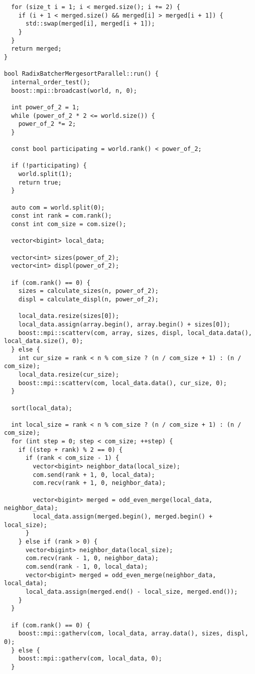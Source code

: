 ﻿\documentclass[a4paper,12pt]{article}
\begin{document}
\begin{lstlisting}
  for (size_t i = 1; i < merged.size(); i += 2) {
    if (i + 1 < merged.size() && merged[i] > merged[i + 1]) {
      std::swap(merged[i], merged[i + 1]);
    }
  }
  return merged;
}

bool RadixBatcherMergesortParallel::run() {
  internal_order_test();
  boost::mpi::broadcast(world, n, 0);

  int power_of_2 = 1;
  while (power_of_2 * 2 <= world.size()) {
    power_of_2 *= 2;
  }

  const bool participating = world.rank() < power_of_2;

  if (!participating) {
    world.split(1);
    return true;
  }

  auto com = world.split(0);
  const int rank = com.rank();
  const int com_size = com.size();

  vector<bigint> local_data;

  vector<int> sizes(power_of_2);
  vector<int> displ(power_of_2);

  if (com.rank() == 0) {
    sizes = calculate_sizes(n, power_of_2);
    displ = calculate_displ(n, power_of_2);

    local_data.resize(sizes[0]);
    local_data.assign(array.begin(), array.begin() + sizes[0]);
    boost::mpi::scatterv(com, array, sizes, displ, local_data.data(), local_data.size(), 0);
  } else {
    int cur_size = rank < n % com_size ? (n / com_size + 1) : (n / com_size);
    local_data.resize(cur_size);
    boost::mpi::scatterv(com, local_data.data(), cur_size, 0);
  }

  sort(local_data);

  int local_size = rank < n % com_size ? (n / com_size + 1) : (n / com_size);
  for (int step = 0; step < com_size; ++step) {
    if ((step + rank) % 2 == 0) {
      if (rank < com_size - 1) {
        vector<bigint> neighbor_data(local_size);
        com.send(rank + 1, 0, local_data);
        com.recv(rank + 1, 0, neighbor_data);

        vector<bigint> merged = odd_even_merge(local_data, neighbor_data);
        local_data.assign(merged.begin(), merged.begin() + local_size);
      }
    } else if (rank > 0) {
      vector<bigint> neighbor_data(local_size);
      com.recv(rank - 1, 0, neighbor_data);
      com.send(rank - 1, 0, local_data);
      vector<bigint> merged = odd_even_merge(neighbor_data, local_data);
      local_data.assign(merged.end() - local_size, merged.end());
    }
  }

  if (com.rank() == 0) {
    boost::mpi::gatherv(com, local_data, array.data(), sizes, displ, 0);
  } else {
    boost::mpi::gatherv(com, local_data, 0);
  }


\end{lstlisting}
\end{document}
